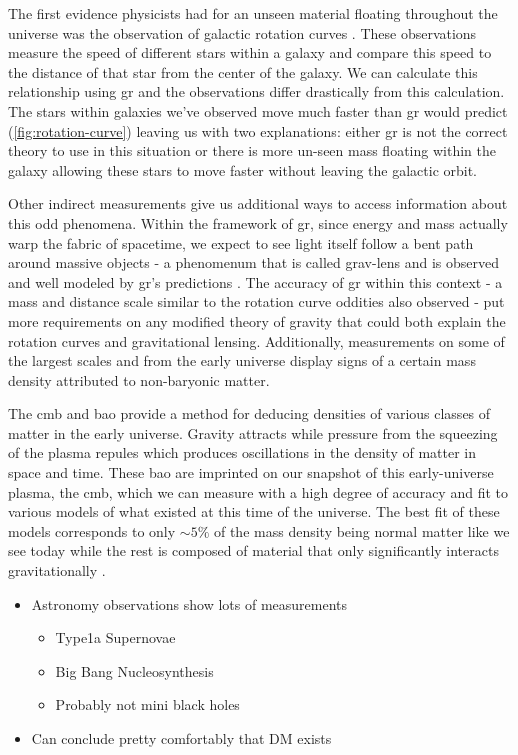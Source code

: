 The first evidence physicists had for an unseen material floating throughout the universe
was the observation of galactic rotation curves \cite{rubin-rotationcurve-1980,rotationcurve-2000}.
These observations measure the speed of different stars within a galaxy and compare this speed to
the distance of that star from the center of the galaxy. We can calculate this relationship
using \gls{gr} \cite{rotationcurve-predictions-2007} and the
observations differ drastically from this calculation. The stars within galaxies we've observed move
much faster than \gls{gr} would predict (\cref{fig:rotation-curve}) leaving us with two explanations: either \gls{gr} is not the correct theory
to use in this situation or there is more un-seen mass floating within the galaxy allowing these stars
to move faster without leaving the galactic orbit.

Other indirect measurements give us additional ways to access information about this odd phenomena.
Within the framework of \gls{gr}, since energy and mass actually warp the fabric of spacetime,
we expect to see light itself follow a bent path around massive objects - a phenomenum that is called
\gls{grav-lens} and is observed and well modeled by \gls{gr}'s predictions \cite{gravlensing-2004}.
The accuracy of \gls{gr} within this context - a mass and distance scale similar to the rotation curve oddities also observed -
put more requirements on any modified theory of gravity that could both explain the rotation curves and gravitational lensing.
Additionally, measurements on some of the largest scales and from the early universe
display signs of a certain mass density attributed to non-baryonic matter.

The \gls{cmb} and \gls{bao} provide a method for deducing densities of various classes of matter
in the early universe. Gravity attracts while pressure from the squeezing of the plasma repules
which produces oscillations in the density of matter in space and time. These \gls{bao} are
imprinted on our snapshot of this early-universe plasma, the \gls{cmb}, which we can measure with
a high degree of accuracy and fit to various models of what existed at this time of the universe.
The best fit of these models corresponds to only $\sim 5\%$ of the mass density being normal matter
like we see today while the rest is composed of material that only significantly
interacts gravitationally \cite{planck-cmb-2015}.

\begin{itemize}
    \item Astronomy observations show lots of measurements
          \begin{itemize}
              \item Type1a Supernovae \cite{type1a-supernova-2010}
              \item Big Bang Nucleosynthesis \cite{nucleosynthesis-1998}
              \item Probably not mini black holes \cite{constraints-primordial-black-holes-2021}
          \end{itemize}
    \item Can conclude pretty comfortably that DM exists
\end{itemize}

